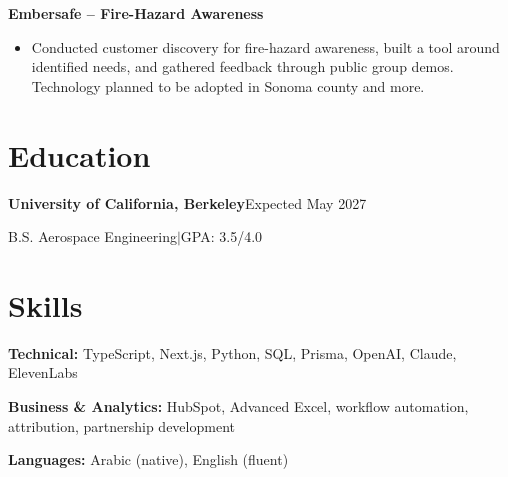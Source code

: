 \documentclass[a4paper,10pt]{article}
\newcommand{\project}[2]{\textbf{#1}\hfill #2\par}
\begin{document}
\project{Embersafe -- Fire-Hazard Awareness}{}
\begin{itemize}
  \item Conducted customer discovery for fire-hazard awareness,
  built a tool around identified needs, and gathered feedback
  through public group demos. Technology planned to be adopted in Sonoma county and more.
\end{itemize}

\section{Education}
\textbf{University of California, Berkeley}\hfill Expected May 2027\par
B.S. Aerospace Engineering\enspace$|$\enspace GPA: 3.5/4.0\par

\section{Skills}
\textbf{Technical:} TypeScript, Next.js, Python, SQL, Prisma,
OpenAI, Claude, ElevenLabs\par
\textbf{Business \& Analytics:} HubSpot, Advanced Excel,
workflow automation, attribution, partnership development\par
\textbf{Languages:} Arabic (native), English (fluent)
\end{document}
